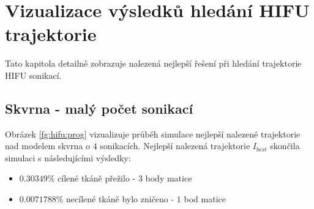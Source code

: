 \chapter{Vizualizace výsledků hledání HIFU trajektorie}
Tato kapitola detailně zobrazuje nalezená nejlepší řešení při hledání trajektorie HIFU sonikací.

\section{Skvrna - malý počet sonikací}
Obrázek \ref{fg:hifu:prog} vizualizuje průběh simulace nejlepší nalezené trajektorie nad modelem skvrna o $4$ sonikacích. Nejlepší nalezená trajektorie $I_{best}$ skončila simulaci s následujícími výsledky:
\begin{center}
\begin{itemize}
    \item $0.30349\%$ cílené tkáně přežilo - $3$ body matice
    \item $0.0071788\%$ necílené tkáně bylo zničeno - $1$ bod matice
\end{itemize}
\end{center}


